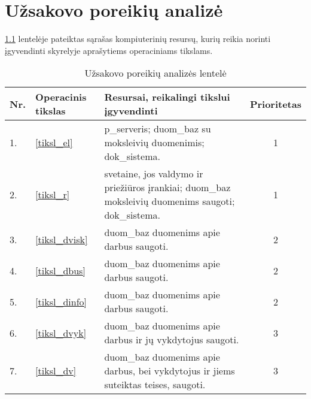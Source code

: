 \chapter{Užsakovo poreikių analizė}


\ref{tab:poreikiai} lentelėje pateiktas sąrašas kompiuterinių resursų, 
kurių reikia norinti įgyvendinti \emph{}
skyrelyje aprašytiems operaciniams tikslams.

\begin{table}
  \centering
  \begin{tabular}[]{| l | p{1.6cm} | p{5.8cm} | c |}
    \hline
    Nr. & Operacinis tikslas & Resursai, reikalingi tikslui įgyvendinti &
    Prioritetas \\
    \hline
    1. & \ref{tiksl_el} & 
      \Gls{p_serveris}; \gls{duom_baz} su moksleivių duomenimis; 
      \gls{dok_sistema}. & 1 \\
    \hline
    2. & \ref{tiksl_r} & 
      \Gls{svetaine}, jos valdymo ir priežiūros įrankiai; 
      \gls{duom_baz} moksleivių duomenims saugoti; 
      \gls{dok_sistema}. & 1 \\
    \hline
    3. & \ref{tiksl_dvisk} &
      \Gls{duom_baz} duomenims apie darbus saugoti. & 2 \\
    \hline
    4. & \ref{tiksl_dbus} &
      \Gls{duom_baz} duomenims apie darbus saugoti. & 2 \\
    \hline
    5. & \ref{tiksl_dinfo} &
      \Gls{duom_baz} duomenims apie darbus saugoti. & 2 \\
    \hline
    6. & \ref{tiksl_dvyk} &
      \Gls{duom_baz} duomenims apie darbus ir jų vykdytojus 
      saugoti. & 3 \\
    \hline
    7. & \ref{tiksl_dv} &
      \Gls{duom_baz} duomenims apie darbus, bei vykdytojus ir 
      jiems suteiktas teises, saugoti. & 3 \\
    \hline
  \end{tabular}
  \caption{Užsakovo poreikių analizės lentelė}
  \label{tab:poreikiai}
\end{table}
